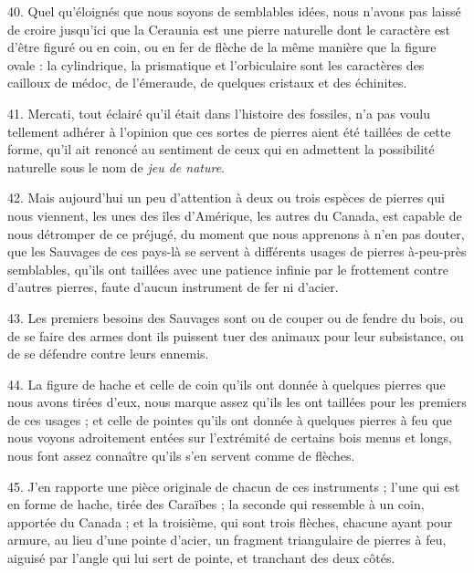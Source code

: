 \documentclass[a4paper, 11pt, oneside, polutonikogreek, french]{article}
\begin{document}
40. Quel qu’éloignés que nous soyons de semblables idées, nous n'avons pas laissé de croire jusqu'ici que la Ceraunia est une pierre naturelle dont le caractère est d'être figuré ou en coin, ou en fer de flèche de la même manière que la figure ovale : la cylindrique, la prismatique et l'orbiculaire sont les caractères des cailloux de médoc, de l'émeraude, de quelques cristaux et des échinites.

41. Mercati, tout éclairé qu'il était dans l'histoire des fossiles, n'a pas voulu tellement adhérer à l'opinion que ces sortes de pierres aient été taillées de cette forme, qu'il ait renoncé au sentiment de ceux qui en admettent la possibilité naturelle sous le nom de \emph{jeu de nature}.

42. Mais aujourd'hui un peu d'attention à deux ou trois espèces de pierres qui nous viennent, les unes des îles d'Amérique, les autres du Canada, est capable de nous détromper de ce préjugé, du moment que nous apprenons à n'en pas douter, que les Sauvages de ces pays-là se servent à différents usages de pierres à-peu-près semblables, qu'ils ont taillées avec une patience infinie par le frottement contre d'autres pierres, faute d'aucun instrument de fer ni d'acier.

43. Les premiers besoins des Sauvages sont ou de couper ou de fendre du bois, ou de se faire des armes dont ils puissent tuer des animaux pour leur subsistance, ou de se défendre contre leurs ennemis.

44. La figure de hache et celle de coin qu'ils ont donnée à quelques pierres que nous avons tirées d'eux, nous marque assez qu'ils les ont taillées pour les premiers de ces usages ; et celle de pointes qu'ils ont donnée à quelques pierres à feu que nous voyons adroitement entées sur l'extrémité de certains bois menus et longs, nous font assez connaître qu'ils s'en servent comme de flèches.

45. J'en rapporte une pièce originale de chacun de ces instruments ; l'une qui est en forme de hache, tirée des Caraïbes ; la seconde qui ressemble à un coin, apportée du Canada ; et la troisième, qui sont trois flèches, chacune ayant pour armure, au lieu d'une pointe d'acier, un fragment triangulaire de pierres à feu, aiguisé par l'angle qui lui sert de pointe, et tranchant des deux côtés.
\end{document}
